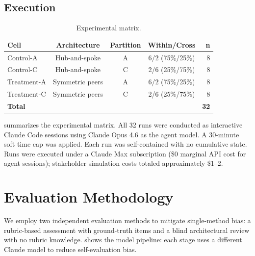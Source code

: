 \documentclass[11pt,letterpaper]{article}
\begin{document}
\subsection{Execution}

\begin{table}[t]
  \caption{Experimental matrix.}
  \label{tab:matrix}
  \centering\small
  \begin{tabular}{lcccr}
    \toprule
    \textbf{Cell} & \textbf{Architecture} & \textbf{Partition}
      & \textbf{Within/Cross} & \textbf{n} \\
    \midrule
    Control-A   & Hub-and-spoke   & A & 6/2 (75\%/25\%) & 8 \\
    Control-C   & Hub-and-spoke   & C & 2/6 (25\%/75\%) & 8 \\
    Treatment-A & Symmetric peers & A & 6/2 (75\%/25\%) & 8 \\
    Treatment-C & Symmetric peers & C & 2/6 (25\%/75\%) & 8 \\
    \midrule
    \textbf{Total} & & & & \textbf{32} \\
    \bottomrule
  \end{tabular}
\end{table}

 summarizes the experimental matrix.
All 32 runs were conducted as interactive Claude Code sessions using
Claude Opus 4.6 as the agent model. A 30-minute soft time cap was applied.
Each run was self-contained with no cumulative state. Runs were executed
under a Claude Max subscription (\$0 marginal API cost for agent
sessions); stakeholder simulation costs totaled approximately \$1--2.


\section{Evaluation Methodology}
\label{sec:eval}

We employ two independent evaluation methods to mitigate single-method
bias: a rubric-based assessment with ground-truth items and a blind
architectural review with no rubric knowledge. 
shows the model pipeline: each stage uses a different Claude model to
reduce self-evaluation bias.
\end{document}

